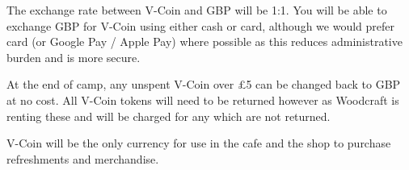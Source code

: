 \documentclass[a4paper, 11pt]{report}
\begin{document}
The exchange rate between V-Coin and GBP will be 1:1. You will be able to exchange GBP for V-Coin using either cash or card, although we would prefer card (or Google Pay / Apple Pay) where possible as this reduces administrative burden and is more secure.\nl

At the end of camp, any unspent V-Coin over £5 can be changed back to GBP at no cost. All V-Coin tokens will need to be returned however as Woodcraft is renting these and will be charged for any which are not returned.\nl

V-Coin will be the only currency for use in the cafe and the shop to purchase refreshments and merchandise.


\backPage
\end{document}
